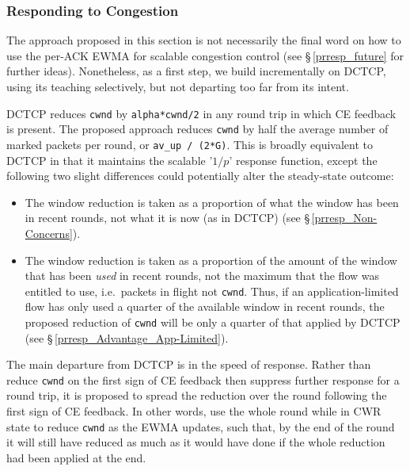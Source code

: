 
\subsubsection{Responding to Congestion}\label{prresp_congestion_response}

The approach proposed in this section is not necessarily the final word on how
to use the per-ACK EWMA for scalable congestion control (see
\S\,\ref{prresp_future} for further ideas). Nonetheless, as a first step, we
build incrementally on DCTCP, using its teaching selectively, but not departing
too far from its intent. 

DCTCP reduces \texttt{cwnd} by \texttt{alpha*cwnd/2} in any round trip in which
CE feedback is present. The proposed approach reduces \texttt{cwnd} by half the
average number of marked packets per round, or \texttt{av\_up / (2*G)}. This is
broadly equivalent to DCTCP in that it maintains the scalable '\(1/p\)' response
function, except the following two slight differences could potentially alter
the steady-state outcome:
\begin{itemize}[nosep]
	\item The window reduction is taken as a proportion of what the window has been
	in recent rounds, not what it is now (as in DCTCP) (see
	\S\,\ref{prresp_Non-Concerns}).
	\item The window reduction is taken as a proportion of the amount of the window
	that has been \emph{used} in recent rounds, not the maximum that the flow was
	entitled to use, i.e.\ packets in flight not \texttt{cwnd}. Thus, if an
	application-limited flow has only used a quarter of the available window in
	recent rounds, the proposed reduction of \texttt{cwnd} will be only a quarter of
	that applied by DCTCP (see \S\,\ref{prresp_Advantage_App-Limited}).
\end{itemize}

The main departure from DCTCP is in the speed of response. Rather than reduce 
\texttt{cwnd} on the first sign of CE feedback then suppress further response
for a round trip, it is proposed to spread the reduction over the round
following the first sign of CE feedback. In other words, use the whole round
while in CWR state to reduce \texttt{cwnd} as the EWMA updates, such that, by
the end of the round it will still have reduced as much as it would have done if
the whole reduction had been applied at the end. 

